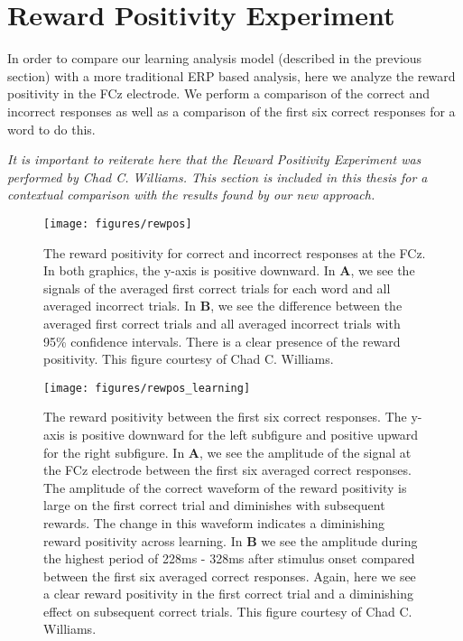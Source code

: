 \section{Reward Positivity Experiment}

In order to compare our learning analysis model (described in the previous 
section) with a more traditional ERP based analysis, here we analyze the reward 
positivity in the FCz electrode. We perform a comparison of the correct and 
incorrect responses as well as a comparison of the first six correct responses 
for a word to do this.

\emph{It is important to reiterate here that the Reward Positivity Experiment 
was performed by Chad C. Williams. This section is included in this thesis for 
a contextual comparison with the results found by our new approach.}

\begin{figure}[p]
  \centerline{
    \texttt{[image: figures/rewpos]}
  }
  \caption[Reward Positivity for Correct and Incorrect Responses]{
    The reward positivity for correct and incorrect responses at the FCz. In 
    both graphics, the y-axis is positive downward. In {\bf A}, we see the 
    signals of the averaged first correct trials for each word and all averaged 
    incorrect trials. In {\bf B}, we see the difference between the averaged 
    first correct trials and all averaged incorrect trials with 95\% confidence 
    intervals. There is a clear presence of the reward positivity. This figure 
    courtesy of Chad C. Williams.
  }
  \label{fig:rewpos}
\end{figure}

\begin{figure}[p]
  \centerline{
    \texttt{[image: figures/rewpos\_learning]}
  }
  \caption[Reward Positivity between the First Six Correct Responses]{
    The reward positivity between the first six correct responses. The y-axis 
    is positive downward for the left subfigure and positive upward for the 
    right subfigure. In {\bf A}, we see the amplitude of the signal at the FCz 
    electrode between the first six averaged correct responses. The amplitude 
    of the correct waveform of the reward positivity is large on the first 
    correct trial and diminishes with subsequent rewards.  The change in this 
    waveform indicates a diminishing reward positivity across learning. In {\bf 
    B} we see the amplitude during the highest period of 228ms - 328ms after 
    stimulus onset compared between the first six averaged correct responses.  
    Again, here we see a clear reward positivity in the first correct trial and 
    a diminishing effect on subsequent correct trials. This figure courtesy of 
    Chad C. Williams.
  }
  \label{fig:rewpos_learning}
\end{figure}

